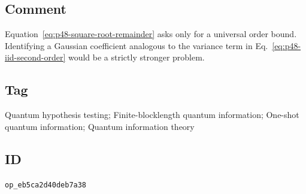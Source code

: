 \subsection*{Comment}

Equation~\eqref{eq:p48-square-root-remainder} asks only for a universal order
bound.  Identifying a Gaussian coefficient analogous to the variance term in
Eq.~\eqref{eq:p48-iid-second-order} would be a strictly stronger problem.

\subsection*{Tag}

Quantum hypothesis testing; Finite-blocklength quantum information;
One-shot quantum information; Quantum information theory

\subsection*{ID}

\texttt{op\_eb5ca2d40deb7a38}

